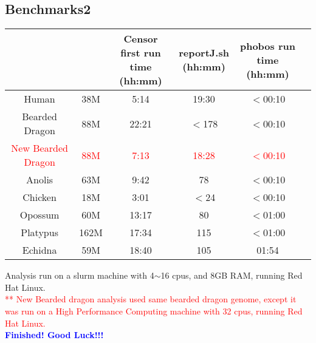 \documentclass[a4paper,12pt]{article}
\begin{document}
	\subsection{Benchmarks2}
	
	\footnotesize  %
	\setlength\tabcolsep{1.5pt}
	\begin{center}
		\begin{tabular}{ | c | c | c | c| c |c|}
			\hline
			\thead{Genome}	& 	\thead{Consensus sequences size}	&	\thead{Censor first run \\ time (hh:mm)}	&	\thead{reportJ.sh \\ (hh:mm)}	&	\thead{phobos run time \\ (hh:mm)} \\
			\hline
			Human	&	38M	&	5:14	&	19:30	&	$<$00:10 \\
			\hline 
			Bearded Dragon	&	88M	&	22:21	&	$<$178	&	$<$00:10 \\
			\hline
			\textcolor{red}{New Bearded Dragon}	&	\textcolor{red}{88M}	&	\textcolor{red}{7:13}	&	\textcolor{red}{18:28}	&	\textcolor{red}{$<$00:10} \\
			\hline
			Anolis	&	63M	&	9:42	&	78	&	$<$00:10 \\
			\hline
			Chicken	&	18M	&	3:01	&	$<$24	&	$<$00:10 \\
			\hline
			Opossum	&	60M	&	13:17	&	80	&	$<$01:00 \\
			\hline
			Platypus	&	162M	&	17:34	&	115	&	$<$01:00 \\
			\hline
			Echidna	&	59M	&	18:40	&	105	&	01:54 \\
			\hline
		\end{tabular}
	\end{center}
	
	\noindent * Analysis run on a slurm machine with 4$\sim$16 cpus, and 8GB RAM, running Red Hat Linux.\\
	\textcolor{red}{** New Bearded dragon analysis used same bearded dragon genome, except it was run on a High Performance Computing machine with 32 cpus, running Red Hat Linux.} \\

\noindent \textbf{\textcolor{blue}{ \Large Finished! Good Luck!!!}}
\end{document}
